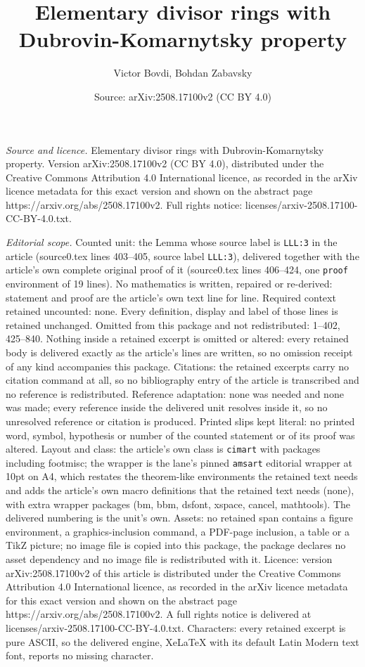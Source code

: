 \documentclass[10pt,a4paper]{amsart}
\title[Elementary divisor rings with Dubrovin-Komarnytsky property]{Elementary divisor rings with Dubrovin-Komarnytsky property}
\author{Victor Bovdi, Bohdan Zabavsky}
\date{Source: arXiv:2508.17100v2 (CC BY 4.0)}
\begin{document}
\maketitle

\noindent\emph{Source and licence.} Elementary divisor rings with Dubrovin-Komarnytsky property. Version arXiv:2508.17100v2 (CC BY 4.0), distributed under the Creative Commons Attribution 4.0 International licence, as recorded in the arXiv licence metadata for this exact version and shown on the abstract page https://arxiv.org/abs/2508.17100v2. Full rights notice: licenses/arxiv-2508.17100-CC-BY-4.0.txt.\par\smallskip

\noindent\textit{Editorial scope.} Counted unit: the Lemma whose source label is \texttt{LLL:3} in the article (source0.tex lines 403--405, source label \texttt{LLL:3}), delivered together with the article's own complete original proof of it (source0.tex lines 406--424, one \texttt{proof} environment of 19 lines). No mathematics is written, repaired or re-derived: statement and proof are the article's own text line for line. Required context retained uncounted: none. Every definition, display and label of those lines is retained unchanged. Omitted from this package and not redistributed: 1--402, 425--840. Nothing inside a retained excerpt is omitted or altered: every retained body is delivered exactly as the article's lines are written, so no omission receipt of any kind accompanies this package. Citations: the retained excerpts carry no citation command at all, so no bibliography entry of the article is transcribed and no reference is redistributed. Reference adaptation: none was needed and none was made; every reference inside the delivered unit resolves inside it, so no unresolved reference or citation is produced. Printed slips kept literal: no printed word, symbol, hypothesis or number of the counted statement or of its proof was altered. Layout and class: the article's own class is \texttt{cimart} with packages including footmisc; the wrapper is the lane's pinned \texttt{amsart} editorial wrapper at 10pt on A4, which restates the theorem-like environments the retained text needs and adds the article's own macro definitions that the retained text needs (none), with extra wrapper packages (bm, bbm, dsfont, xspace, cancel, mathtools). The delivered numbering is the unit's own. Assets: no retained span contains a figure environment, a graphics-inclusion command, a PDF-page inclusion, a table or a TikZ picture; no image file is copied into this package, the package declares no asset dependency and no image file is redistributed with it. Licence: version arXiv:2508.17100v2 of this article is distributed under the Creative Commons Attribution 4.0 International licence, as recorded in the arXiv licence metadata for this exact version and shown on the abstract page https://arxiv.org/abs/2508.17100v2. A full rights notice is delivered at licenses/arxiv-2508.17100-CC-BY-4.0.txt. Characters: every retained excerpt is pure ASCII, so the delivered engine, XeLaTeX with its default Latin Modern text font, reports no missing character.
\end{document}
